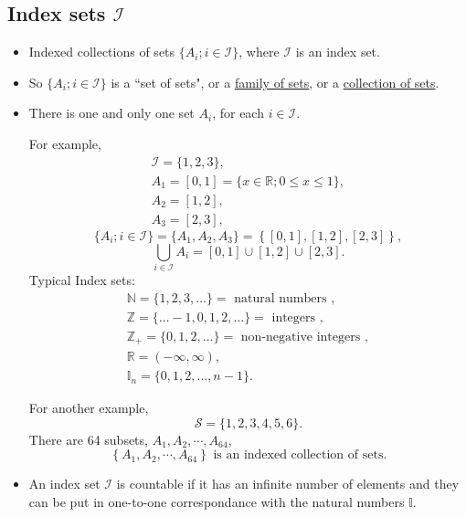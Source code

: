 \documentclass[12pt,thmsa]{article}
\begin{document}
\subsection{Index sets \(\mathcal{I}\)} %
\begin{itemize}
	\item   Indexed collections of sets \( \{A_{i} ; i \in \mathcal{I}\} \), where \(\mathcal{I} \) is an index set.
	\item   So \( \{A_{i} ; i \in \mathcal{I}\} \) is a ``set of sets", or a \underline{family of sets}, or a \underline{collection of sets}.
	\item  There is one and only one set \( A_{i} \), for each \( i \in \mathcal{I} \).

For example,
\[\begin{array}{l}  \mathcal{I} = \{ 1,2,3\} , \\A_{1}=[0,1]=\{x \in \mathbb{R} ; 0 \leq x \leq 1\}, \\  A_{2}=[1,2] , \\  A_{3}=[2,3], \end{array}\]
\[ \{A_{i} ; i \in \mathcal{I}\} =\{ A_1, A_2, A_3  \} = \left\{ [0,1], [1,2], [2,3] \right\}, \]
\[\bigcup_{i \in \mathcal{I}} A_{i}=[0,1] \cup[1,2] \cup[2,3].\]
Typical Index sets:
\[\begin{array}{l} 
	\mathbb{N}=\{1,2,3, \ldots\}=\text { natural numbers }, \\ 
	\mathbb{Z}=\{\ldots-1,0,1,2, \ldots\}=\text { integers }, \\ 
	\mathbb{Z}_{+}=\{0,1,2, \ldots\}=\text { non-negative integers }, \\
	\mathbb{R}=(-\infty, \infty), \\
	\mathbb{I}_{n}=\{0,1,2, \ldots, n-1\}.
\end{array}\]

For another example,
\[\mathcal{S}=\{1,2,3,4,5,6\}.\]
There are 64 subsets, \(A_{1}, A_{2}, \cdots, A_{64}\),
\[\left\{ A_{1}, A_{2}, \cdots, A_{64} \right\} \text{ is an indexed collection of sets.}\]

	\item  An index set \(\mathcal{I}\) is countable if it has an infinite number of elements and they can be put in one-to-one correspondance with the natural numbers \(\mathbb{I}\).
	

\end{itemize}
\end{document}
